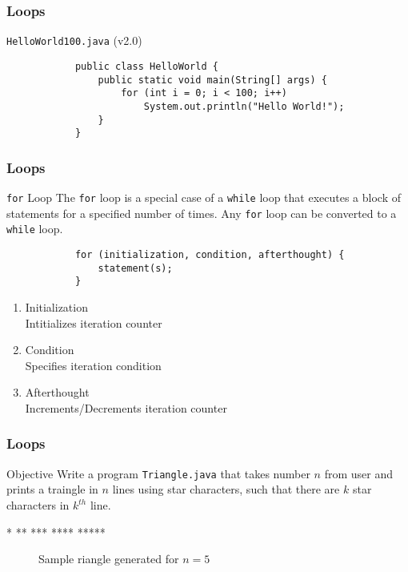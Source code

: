 \documentclass[10pt, compress]{beamer}
\begin{document}
\begin{frame}[fragile]
	\frametitle{Loops}
	\begin{block}{\texttt{HelloWorld100.java} (v2.0)}
		\begin{verbatim}
			public class HelloWorld {
			    public static void main(String[] args) {
			        for (int i = 0; i < 100; i++)
			            System.out.println("Hello World!");
			    }
			}
		\end{verbatim}
	\end{block}
\end{frame}

\begin{frame}[fragile]
	\frametitle{Loops}
	\begin{block}{\texttt{for} Loop}
		The \texttt{for} loop is a special case of a \texttt{while} loop that executes a block of statements for a specified number of times. Any \texttt{for} loop can be converted to a \texttt{while} loop.
		\begin{verbatim}
			for (initialization, condition, afterthought) {
			    statement(s);
			}
		\end{verbatim}
		\begin{enumerate}
			\item Initialization\\Intitializes iteration counter
			\item Condition\\Specifies iteration condition
			\item Afterthought\\Increments/Decrements iteration counter
		\end{enumerate}
	\end{block}
\end{frame}

\begin{frame}[fragile]
	\frametitle{Loops}
	\begin{block}{Objective}
		Write a program \texttt{Triangle.java} that takes number $n$ from user and prints a traingle in $n$ lines using star characters, such that there are $k$ star characters in $k^{th}$ line.
		\begin{verbbox}
		*
		**
		***
		****
		*****
		\end{verbbox}
		\begin{figure}[H]\centering
		\theverbbox
		\caption{Sample riangle generated for $n = 5$}
		\end{figure}
	\end{block}
\end{frame}
\end{document}
